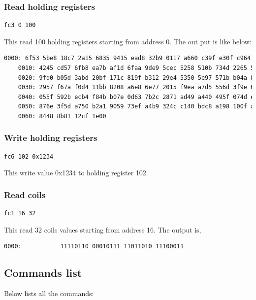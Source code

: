 \documentclass[a4paper,latin]{paper}
\begin{document}
\subsubsection{Read holding registers}
\noindent\begin{lstlisting}[language=bash]
    fc3 0 100
\end{lstlisting}
This read 100 holding registers starting from address 0. The out put is like below:
\noindent\begin{lstlisting}[language=bash]
    0000: 6f53 5be8 18c7 2a15 6835 9415 ead8 32b9 0117 a660 c39f e30f c964 57be ac8b 8a89
    0010: 4245 cd57 6fb8 ea7b af1d 6faa 9de9 5cec 5258 510b 734d 2265 5122 c6ec 7965 6ef5
    0020: 9fd0 b05d 3abd 20bf 171c 819f b312 29e4 5350 5e97 571b b04a 8e36 f006 ddd2 8f7d
    0030: 2957 f67a f0d4 11bb 8208 a6e8 6e77 2015 f9ea a7d5 556d 3f9e 69a1 a41c ad75 0832
    0040: 055f 592b ecb4 f84b b07e 0d63 7b2c 2871 ad49 a440 495f 074d eec9 f250 29e1 ae0e
    0050: 876e 3f5d a750 b2a1 9059 73ef a4b9 324c c140 bdc8 a198 100f acdb 5c04 a6fd 6f64
    0060: 8448 8b81 12cf 1e00
\end{lstlisting}

\subsubsection{Write holding registers}
\noindent\begin{lstlisting}[language=bash]
    fc6 102 0x1234
\end{lstlisting}
This write value 0x1234 to holding register 102.

\subsubsection{Read coils}
\noindent\begin{lstlisting}[language=bash]
    fc1 16 32
\end{lstlisting}
This read 32 coils values starting from address 16. The output is,
\noindent\begin{lstlisting}[language=bash]
0000:           11110110 00010111 11011010 11100011
\end{lstlisting}

\subsection{Commands list}
Below lists all the commands:
\end{document}
